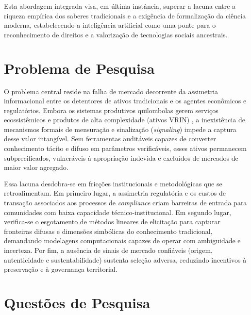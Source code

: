 Esta abordagem integrada visa, em última instância, superar a lacuna entre a riqueza empírica dos saberes tradicionais e a exigência de formalização da ciência moderna, estabelecendo a inteligência artificial como uma ponte para o reconhecimento de direitos e a valorização de tecnologias sociais ancestrais.


\section{Problema de Pesquisa}

O problema central reside na falha de mercado decorrente da assimetria informacional entre os detentores de ativos tradicionais e os agentes econômicos e regulatórios. Embora os sistemas produtivos quilombolas gerem serviços ecossistêmicos e produtos de alta complexidade (ativos VRIN) \cite{Barney1991}, a inexistência de mecanismos formais de mensuração e sinalização (\textit{signaling}) impede a captura desse valor intangível. Sem ferramentas auditáveis capazes de converter conhecimento tácito e difuso em parâmetros verificáveis, esses ativos permanecem subprecificados, vulneráveis à apropriação indevida e excluídos de mercados de maior valor agregado.

Essa lacuna desdobra-se em fricções institucionais e metodológicas que se retroalimentam. Em primeiro lugar, a assimetria regulatória e os custos de transação associados aos processos de \textit{compliance} criam barreiras de entrada para comunidades com baixa capacidade técnico-institucional. Em segundo lugar, verifica-se o esgotamento de métodos lineares de elicitação para capturar fronteiras difusas e dimensões simbólicas do conhecimento tradicional, demandando modelagens computacionais capazes de operar com ambiguidade e incerteza. Por fim, a ausência de sinais de mercado confiáveis (origem, autenticidade e sustentabilidade) sustenta seleção adversa, reduzindo incentivos à preservação e à governança territorial.


\section{Questões de Pesquisa}

